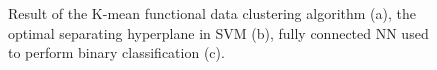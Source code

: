 \begin{figure}
    \centering
    \qquad
    \caption[HS detection methods.]{Result of the K-mean functional data clustering algorithm (a), the optimal separating hyperplane in SVM (b), fully connected NN used to perform binary classification (c)\cite{bugatti_towards_2022}.}
\end{figure}


